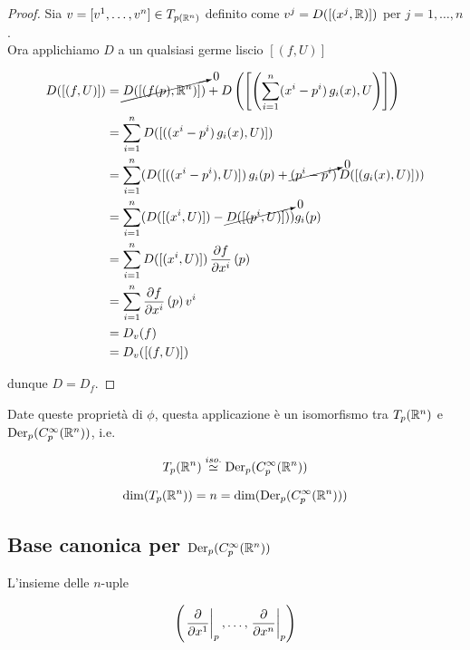\begin{proof}
	Sia $ v = [v^{1},\dots,v^{n}] \in T_{p (\mathbb{R}^{n})} $ definito come $ v^{j} = D([(x^{j},\mathbb{R})]) $ per $ j=1,\dots,n $.\\
	Ora applichiamo $ D $ a un qualsiasi germe liscio $ [(f,U)] $
	
	\begin{align}
		\begin{split}
			D ([(f,U)]) &= \cancelto{0}{D ([(f(p),\mathbb{R}^{n})])} + D \left(\left[\left( \sum_{i=1}^{n} (x^{i}-p^{i}) \, g_{i}(x) , U \right)\right]\right)\\
			&= \sum_{i=1}^{n} D ([( (x^{i}-p^{i}) \, g_{i}(x) , U )])\\
			&= \sum_{i=1}^{n} ( D ([( (x^{i}-p^{i}), U )]) \, g_{i}(p) + \cancelto{0}{(p^{i}-p^{i})} \, D ([( g_{i}(x), U )]) )\\
			&= \sum_{i=1}^{n} ( D ([( x^{i}, U )]) - \cancelto{0}{D ([( p^{i}, U )])} ) g_{i}(p)\\
			&= \sum_{i=1}^{n} D ([( x^{i}, U )]) \, \pdv{f}{x^{i}} \, (p)\\
			&= \sum_{i=1}^{n} \pdv{f}{x^{i}} \, (p) \, v^{i}\\
			&= D_{v} (f)\\
			&= D_{v} ([(f,U)])
		\end{split}
	\end{align}

	dunque $ D = D_{f} $.
\end{proof}

Date queste proprietà di $ \phi $, questa applicazione è un isomorfismo tra $ T_{p}(\mathbb{R}^{n}) $ e $ \operatorname{Der}_{p}(C_{p}^{\infty}(\mathbb{R}^{n})) $, i.e.

\begin{equation}
	T_{p}(\mathbb{R}^{n}) \stackrel{iso.}{\simeq} \operatorname{Der}_{p}(C_{p}^{\infty}(\mathbb{R}^{n}))
\end{equation}

\begin{corollary}
	\begin{equation}
		\dim ( T_{p}(\mathbb{R}^{n}) ) = n = \dim ( \operatorname{Der}_{p}(C_{p}^{\infty}(\mathbb{R}^{n})) )
	\end{equation}
\end{corollary}

\subsection{Base canonica per $ \operatorname{Der}_{p}(C_{p}^{\infty}(\mathbb{R}^{n})) $}

L'insieme delle $ n $-uple

\begin{equation}
	\left( \eval{ \pdv{x^{1}} }_{p}, \dots, \eval{ \pdv{x^{n}} }_{p}  \right)
\end{equation}

